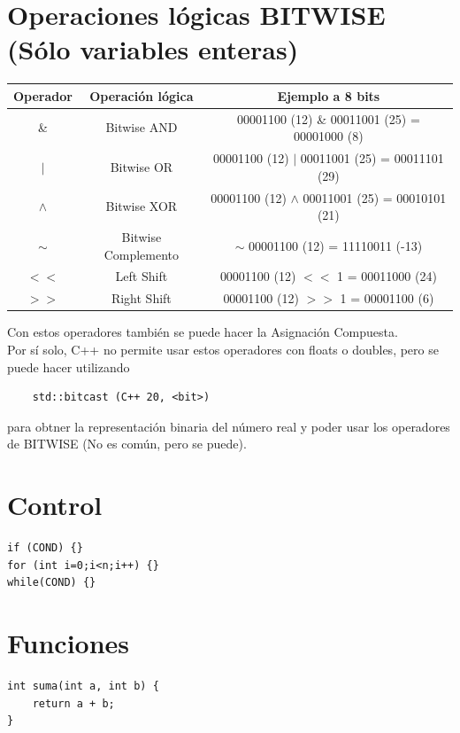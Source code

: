 \documentclass[a4paper,11pt]{article}
\begin{document}
\section*{Operaciones lógicas BITWISE (Sólo variables enteras)}
\begin{center}
    \begin{tabular}{| c | c | c |}
    \hline
    Operador & Operación lógica & Ejemplo a 8 bits \\
    \hline\hline 
    \& & Bitwise AND & 00001100 (12) \& 00011001 (25) = 00001000 (8) \\
    \hline
    $|$ & Bitwise OR &  00001100 (12) $|$ 00011001 (25) = 00011101 (29) \\
    \hline
    $\wedge$ & Bitwise XOR &  00001100 (12) $\wedge$ 00011001 (25) = 00010101 (21) \\
    \hline
    $\sim$  & Bitwise Complemento  & $\sim$ 00001100 (12) = 11110011 (-13)\\
    \hline
    $<<$ & Left Shift & 00001100 (12) $<<$ 1 = 00011000 (24)\\
    \hline
    $>>$ & Right Shift &  00001100 (12) $>>$ 1 = 00001100 (6) \\
    \hline
    \end{tabular}
\end{center}

Con estos operadores también se puede hacer la Asignación Compuesta.\\

Por sí solo, C++ no permite usar estos operadores con floats o doubles, pero se puede hacer
utilizando \begin{lstlisting}
    std::bitcast (C++ 20, <bit>)
\end{lstlisting} 
para obtner la representación binaria del número real y poder usar los 
operadores de BITWISE (No es común, pero se puede).

\section*{Control}
\begin{lstlisting}
if (COND) {}
for (int i=0;i<n;i++) {}
while(COND) {}
\end{lstlisting}

\section*{Funciones}
\begin{lstlisting}
int suma(int a, int b) {
    return a + b;
}
\end{lstlisting}
\end{document}
